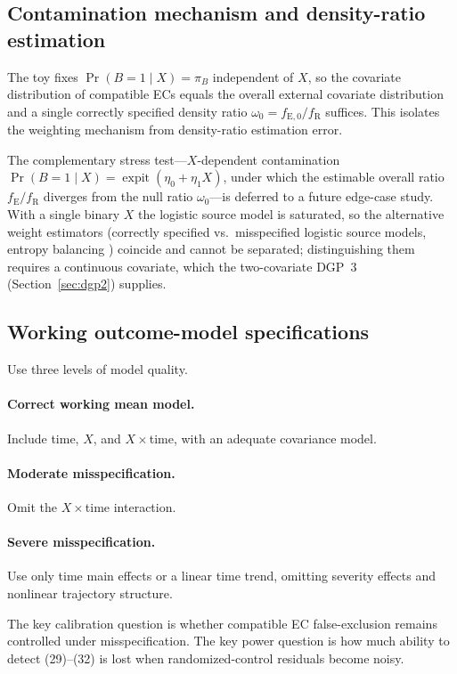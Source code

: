 \documentclass[11pt]{article}
\newcommand{\R}{\mathrm{R}}
\newcommand{\E}{\mathrm{E}}
\begin{document}
\subsection{Contamination mechanism and density-ratio estimation}

The toy fixes $\Pr(B=1\mid X)=\pi_B$ independent of $X$, so the covariate distribution of compatible ECs equals the overall external covariate distribution and a single correctly specified density ratio $\omega_0=f_{\E,0}/f_{\R}$ suffices. This isolates the weighting mechanism from density-ratio estimation error.

The complementary stress test---$X$-dependent contamination $\Pr(B=1\mid X)=\operatorname{expit}(\eta_0+\eta_1X)$, under which the estimable overall ratio $f_{\E}/f_{\R}$ diverges from the null ratio $\omega_0$---is deferred to a future edge-case study. With a single binary $X$ the logistic source model is saturated, so the alternative weight estimators (correctly specified vs.\ misspecified logistic source models, entropy balancing \citep{hainmueller2012}) coincide and cannot be separated; distinguishing them requires a continuous covariate, which the two-covariate DGP~3 (Section~\ref{sec:dgp2}) supplies.

\subsection{Working outcome-model specifications}

Use three levels of model quality.

\paragraph{Correct working mean model.}
Include time, $X$, and $X\times$time, with an adequate covariance model.

\paragraph{Moderate misspecification.}
Omit the $X\times$time interaction.

\paragraph{Severe misspecification.}
Use only time main effects or a linear time trend, omitting severity effects and nonlinear trajectory structure.

The key calibration question is whether compatible EC false-exclusion remains controlled under misspecification. The key power question is how much ability to detect (29)--(32) is lost when randomized-control residuals become noisy.
\end{document}
